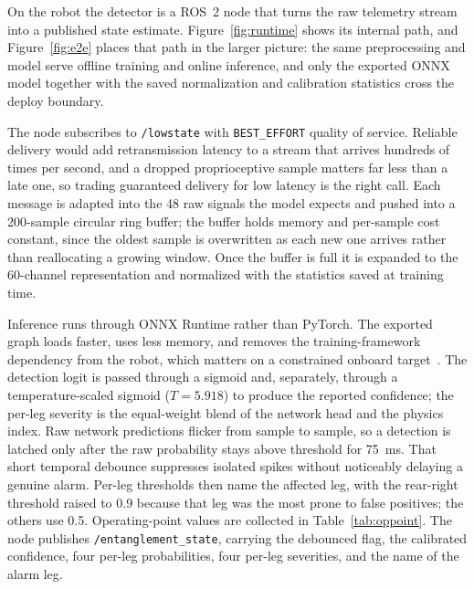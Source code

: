\documentclass[conference]{IEEEtran}
\begin{document}
On the robot the detector is a ROS~2 node that turns the raw telemetry stream into a published
state estimate. Figure~\ref{fig:runtime} shows its internal path, and Figure~\ref{fig:e2e} places
that path in the larger picture: the same preprocessing and model serve offline training and online
inference, and only the exported ONNX model together with the saved normalization and calibration
statistics cross the deploy boundary.

The node subscribes to \texttt{/lowstate} with \texttt{BEST\_EFFORT} quality of service. Reliable
delivery would add retransmission latency to a stream that arrives hundreds of times per second, and
a dropped proprioceptive sample matters far less than a late one, so trading guaranteed delivery for
low latency is the right call. Each message is adapted into the 48 raw signals the model expects and
pushed into a 200-sample circular ring buffer; the buffer holds memory and per-sample cost constant,
since the oldest sample is overwritten as each new one arrives rather than reallocating a growing
window. Once the buffer is full it is expanded to the 60-channel representation and normalized with
the statistics saved at training time.

Inference runs through ONNX Runtime rather than PyTorch. The exported graph loads faster, uses less
memory, and removes the training-framework dependency from the robot, which matters on a constrained
onboard target~\cite{onnxruntime,macenski2022ros2}. The detection logit is passed through a sigmoid
and, separately, through a temperature-scaled sigmoid ($T=5.918$) to produce the reported confidence;
the per-leg severity is the equal-weight blend of the network head and the physics index. Raw network
predictions flicker from sample to sample, so a detection is latched only after the raw probability
stays above threshold for 75~ms. That short temporal debounce suppresses isolated spikes without
noticeably delaying a genuine alarm. Per-leg thresholds then name the affected leg, with the
rear-right threshold raised to 0.9 because that leg was the most prone to false positives; the others
use 0.5. Operating-point values are collected in Table~\ref{tab:oppoint}. The node publishes
\texttt{/entanglement\_state}, carrying the debounced flag, the calibrated confidence, four per-leg
probabilities, four per-leg severities, and the name of the alarm leg.
\end{document}
